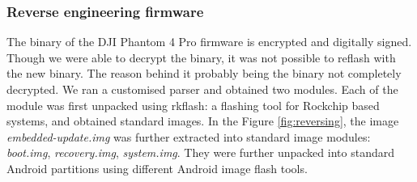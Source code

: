 \documentclass[conference]{IEEEtran}
\begin{document}
\subsubsection{Reverse engineering firmware}
The binary of the DJI Phantom 4 Pro firmware is encrypted and digitally signed. Though we were able to decrypt the binary, it was not possible to reflash with the new binary. The reason behind it probably being the binary not completely decrypted. We ran a customised parser and obtained two modules. Each of the module was first unpacked using rkflash\cite{rkflash}: a flashing tool for Rockchip based systems, and obtained standard images. In the Figure \ref{fig:reversing}, the image \emph{embedded-update.img} was further extracted into standard image modules: \emph{boot.img}, \emph{recovery.img}, \emph{system.img}. They were further unpacked into standard Android partitions using different Android image flash tools.
\end{document}
